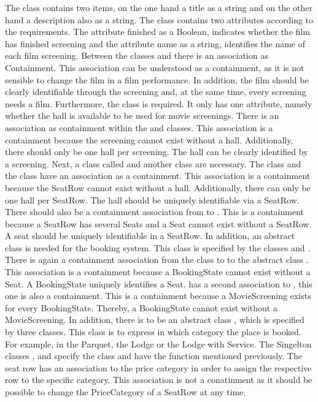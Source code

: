 The class  contains two items, on the one hand a title as a string and on the other hand a description also as a string. The  class contains two attributes according to the requirements. The attribute finished as a Boolean, indicates whether the film has finished screening and the attribute name as a string, identifies the name of each film screening. Between the classes  and  there is an association as Containment. This association can be understood as a containment, as it is not sensible to change the film in a film performance. In addition, the film should be clearly identifiable through the screening and, at the same time, every screening needs a film. 
Furthermore, the  class is required. It only has one attribute, namely whether the hall is available to be used for movie screenings. There is an association as containment within the  and  classes. This association is a containment because the screening cannot exist without a hall. Additionally, there should only be one hall per screening. The hall can be clearly identified by a screening.
Next, a class called  and another class  are necessary. The  class and the  class have an association as a containment.
This association is a containment because the SeatRow cannot exist without a hall. Additionally, there can only be one hall per SeatRow. The hall should be uniquely identifiable via a SeatRow.
There should also be a containment association from  to . This is a containment because a SeatRow has several Seats and a Seat cannot exist without a SeatRow. A seat should be uniquely identifiable in a SeatRow.
In addition, an abstract class  is needed for the booking system. This class is specified by the classes  and . There is again a containment association from the class to  to the abstract class . This association is a containment because a BookingState cannot exist without a Seat. A BookingState uniquely identifies a Seat.
 has a second association to , this one is also a containment. This is a containment because a MovieScreening exists for every BookingState. Thereby, a BookingState cannot exist without a MovieScreening.
In addition, there is to be an abstract class , which is specified by three classes. This class is to express in which category the place is booked. For example, in the Parquet, the Lodge or the Lodge with Service. The Singelton classes ,  and  specify the class  and have the function mentioned previously. The seat row has an association to the price category in order to assign the respective row to the specific category. This association is not a conatinment as it should be possible to change the PriceCategory of a SeatRow at any time. 
